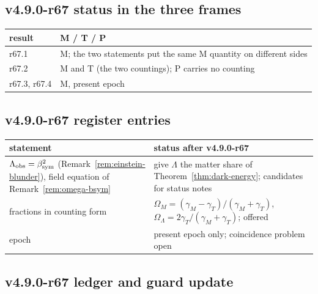 \subsection*{v4.9.0-r67 status in the three frames}
\label{subsec:v490-r67-frames}

\begin{center}
\small
\begin{tabular}{@{}>{\raggedright\arraybackslash}p{}>{\raggedright\arraybackslash}p{}@{}}
\toprule
result & M / T / P\\
\midrule
r67.1 & M; the two statements put the same M quantity on different sides\\
r67.2 & M and T (the two countings); P carries no counting\\
r67.3, r67.4 & M, present epoch\\
\bottomrule
\end{tabular}
\end{center}

\subsection*{v4.9.0-r67 register entries}
\label{subsec:v490-r67-register}

\begin{center}
\small
\begin{tabular}{@{}>{\raggedright\arraybackslash}p{}>{\raggedright\arraybackslash}p{}@{}}
\toprule
statement & status after v4.9.0-r67\\
\midrule
\(\Lambda_{\mathrm{obs}}=\beta_{\mathrm{sym}}^2\) (Remark~\ref{rem:einstein-blunder}), field equation of Remark~\ref{rem:omega-bsym} & give \(\Lambda\) the matter share of Theorem~\ref{thm:dark-energy}; candidates for status notes\\
fractions in counting form & \(\Omega_M=(\gamma_M-\gamma_T)/(\gamma_M+\gamma_T)\), \(\Omega_\Lambda=2\gamma_T/(\gamma_M+\gamma_T)\); offered\\
epoch & present epoch only; coincidence problem open\\
\bottomrule
\end{tabular}
\end{center}

\subsection*{v4.9.0-r67 ledger and guard update}
\label{subsec:v490-r67-ledger-guard}

